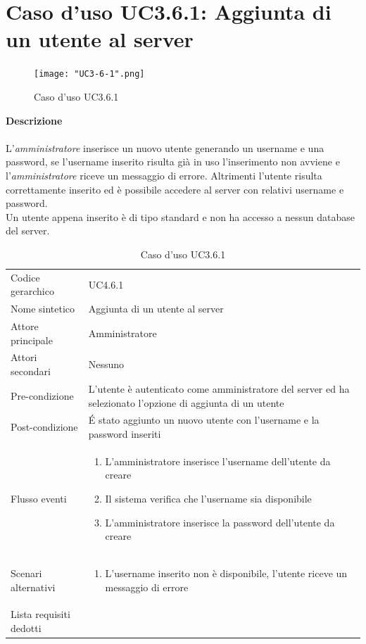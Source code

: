 \documentclass[a4paper]{report}
\begin{document}
	 \section{Caso d'uso UC3.6.1: Aggiunta di un utente al server}
	 \begin{figure}[H]
			\centering
			\texttt{[image: "UC3-6-1".png]}
			\caption{Caso d'uso UC3.6.1}
		\end{figure}
	 \textbf{Descrizione} \\ \\
	 L'\emph{amministratore} inserisce un nuovo utente generando un username e una password, se 
	 l'username inserito risulta già in uso l'inserimento non avviene e l'\emph{amministratore} riceve un
	 messaggio di errore. Altrimenti l'utente risulta correttamente inserito ed è possibile accedere al server
	 con relativi username e password. \\
	 Un utente appena inserito è di tipo standard e non ha accesso a nessun database del server.
		\begin{table}[H]
		\begin{tabularx}{\textwidth}{X | X}\toprule
			\rowcolor{orange!65}Codice gerarchico & UC4.6.1 \\
			Nome sintetico & Aggiunta di un utente al server \\
			\rowcolor{orange!65}Attore principale & Amministratore\\
			Attori secondari & Nessuno \\
			\rowcolor{orange!65}Pre-condizione & L'utente è autenticato come amministratore del server ed
			 ha selezionato l'opzione di aggiunta di un utente\\
			Post-condizione & \'E stato aggiunto un nuovo utente con l'username e la password inseriti\\
			\rowcolor{orange!65}Flusso eventi & \begin{enumerate}
			\item L'amministratore inserisce l'username dell'utente da creare
			\item Il sistema verifica che l'username sia disponibile
			\item L'amministratore inserisce la password dell'utente da creare
			\end{enumerate} \\
			Scenari alternativi & \begin{enumerate}
			\item L'username inserito non è disponibile, l'utente riceve un messaggio di errore
			\end{enumerate} \\
			\rowcolor{orange!65}Lista requisiti dedotti & \\
			\bottomrule
		\end{tabularx}
		\caption{Caso d'uso UC3.6.1}
	 \end{table}
\end{document}
